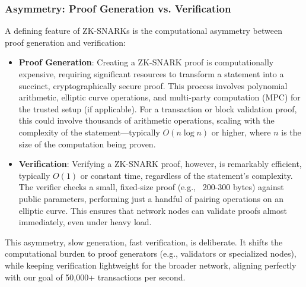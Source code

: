 \documentclass[12pt]{article}
\begin{document}
\subsubsection{Asymmetry: Proof Generation vs. Verification}
\begin{justify}
    A defining feature of ZK-SNARKs is the computational asymmetry between proof generation and verification:
    \begin{itemize}
        \item \textbf{Proof Generation}: Creating a ZK-SNARK proof is computationally expensive, requiring significant resources to transform a statement into a succinct, cryptographically secure proof. This process involves polynomial arithmetic, elliptic curve operations, and multi-party computation (MPC) for the trusted setup (if applicable). For a transaction or block validation proof, this could involve thousands of arithmetic operations, scaling with the complexity of the statement—typically $O(n \log n)$ or higher, where $n$ is the size of the computation being proven.

        \item \textbf{Verification}: Verifying a ZK-SNARK proof, however, is remarkably efficient, typically ${O}(1)$ or constant time, regardless of the statement’s complexity. The verifier checks a small, fixed-size proof (e.g., ~200-300 bytes) against public parameters, performing just a handful of pairing operations on an elliptic curve. This ensures that network nodes can validate proofs almost immediately, even under heavy load.
    \end{itemize}

    This asymmetry, slow generation, fast verification, is deliberate. It shifts the computational burden to proof generators (e.g., validators or specialized nodes), while keeping verification lightweight for the broader network, aligning perfectly with our goal of 50,000+ transactions per second.
\end{justify}
\end{document}

